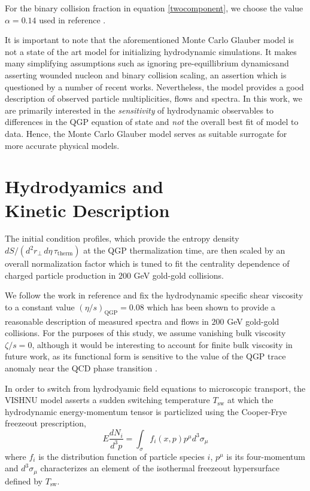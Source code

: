 \documentclass[aps,prc,reprint,amsmath,nofootinbib,superscriptaddress]{revtex4-1}
\begin{document}
For the binary collision fraction in equation \eqref{twocomponent}, we choose the value $\alpha=0.14$ used in reference \cite{?}.

It is important to note that the aforementioned Monte Carlo Glauber model is not a state of the art model for initializing hydrodynamic simulations. It 
makes many simplifying assumptions such as ignoring pre-equillibrium dynamicsand asserting wounded nucleon and binary collision scaling, an assertion 
which is questioned by a number of recent works. Nevertheless, the model provides a good description of observed particle multiplicities, flows and spectra. 
In this work, we are primarily interested in the \emph{sensitivity} of hydrodynamic observables to differences in the QGP equation of state and \emph{not} 
the overall best fit of model to data. Hence, the Monte Carlo Glauber model serves as suitable surrogate for more accurate physical models.

\section{Hydrodyamics and \\ Kinetic Description}

The initial condition profiles, which provide the entropy density $dS/(d^2r_\perp\, d\eta\, \tau_\text{therm})$ at the QGP thermalization time, are then scaled
by an overall normalization factor which is tuned to fit the centrality dependence of charged particle production in $200$ GeV gold-gold collisions.

We follow the work in reference \cite{?} and fix the hydrodynamic specific shear viscosity to a constant value $(\eta/s)_\text{QGP}=0.08$ which has been shown to
provide a reasonable description of measured spectra and flows in $200$ GeV gold-gold collisions. For the purposes of this study, we assume vanishing bulk viscosity 
$\zeta/s=0$, although it would be interesting to account for finite bulk viscosity in future work, as its functional form is sensitive to the value of the QGP trace anomaly 
near the QCD phase transition \cite{?}.

In order to switch from hydrodyamic field equations to microscopic transport, the VISHNU model asserts a sudden switching temperature $T_\text{sw}$ at which the 
hydrodynamic energy-momentum tensor is particlized using the Cooper-Frye freezeout prescription,
\begin{equation}
 E\frac{dN_i}{d^3p} = \int_\sigma f_i(x,p) p^\mu d^3\sigma_\mu
 \label{cooper-frye}
\end{equation}
where $f_i$ is the distribution function of particle species $i$, $p^\mu$ is its four-momentum and $d^3\sigma_\mu$ characterizes an element of the isothermal 
freezeout hypersurface defined by $T_\text{sw}$.
 
\end{document}
